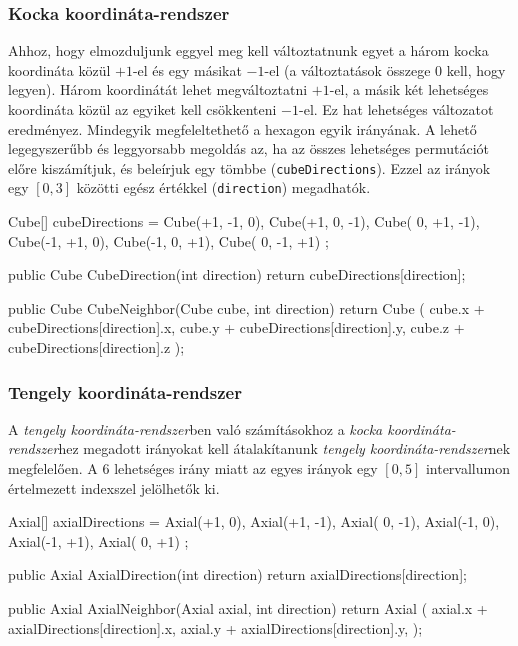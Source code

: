 \subsubsection{Kocka koordináta-rendszer}
\cite{redblobgamesHexagonalGrids}

Ahhoz, hogy elmozduljunk eggyel meg kell változtatnunk egyet a három kocka koordináta közül $+1$-el és egy másikat $-1$-el (a változtatások összege $0$ kell, hogy legyen). Három koordinátát lehet megváltoztatni $+1$-el, a másik két lehetséges koordináta közül az egyiket kell csökkenteni $-1$-el. Ez hat lehetséges változatot eredményez. Mindegyik megfeleltethető a hexagon egyik irányának. A lehető legegyszerűbb és leggyorsabb megoldás az, ha az összes lehetséges permutációt előre kiszámítjuk, és beleírjuk egy tömbbe (\texttt{cubeDirections}). Ezzel az irányok egy $[0, 3]$ közötti egész értékkel (\texttt{direction}) megadhatók.
\begin{cpp}
Cube[] cubeDirections = 
{ 
   Cube(+1, -1,  0), Cube(+1,  0, -1), Cube( 0, +1, -1),
   Cube(-1, +1,  0), Cube(-1,  0, +1), Cube( 0, -1, +1) 
};

public Cube CubeDirection(int direction)
{
   return cubeDirections[direction];
}

public Cube CubeNeighbor(Cube cube, int direction)
{
   return Cube
   (
      cube.x + cubeDirections[direction].x, 
      cube.y + cubeDirections[direction].y, 
      cube.z + cubeDirections[direction].z
   );
}
\end{cpp}

\subsubsection{Tengely koordináta-rendszer}
\cite{redblobgamesHexagonalGrids}

\noindent A \textit{tengely koordináta-rendszer}ben való számításokhoz a \textit{kocka koordináta-rendszer}hez megadott irányokat kell átalakítanunk \textit{tengely koordináta-rendszer}nek megfelelően. A 6 lehetséges irány miatt az egyes irányok egy $[0, 5]$ intervallumon értelmezett indexszel jelölhetők ki.
\begin{cpp}
Axial[] axialDirections = 
{ 
   Axial(+1,  0), Axial(+1, -1), Axial( 0, -1),
   Axial(-1,  0), Axial(-1, +1), Axial( 0, +1)
};

public Axial AxialDirection(int direction)
{
   return axialDirections[direction];
}

public Axial AxialNeighbor(Axial axial, int direction)
{
   return Axial
   (
      axial.x + axialDirections[direction].x, 
      axial.y + axialDirections[direction].y, 
   );
}
\end{cpp}

